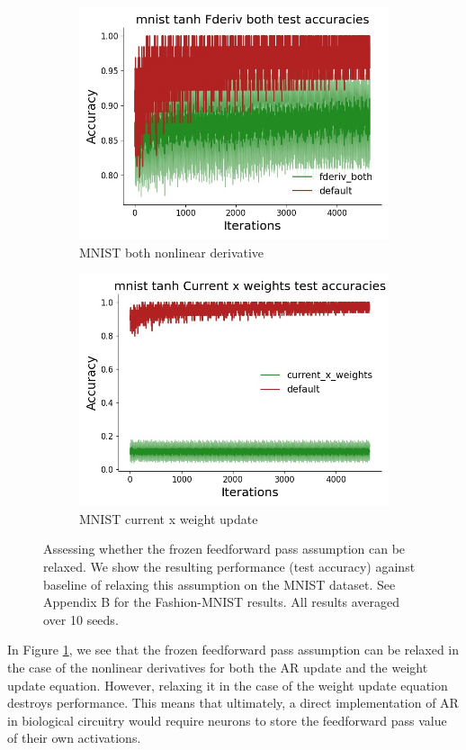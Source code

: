 \begin{figure}[htb]
\begin{subfigure}[b]{0.4\linewidth}
  \end{subfigure} 
  \begin{subfigure}[b]{0.4\linewidth}
    \centering
    \includegraphics[width=0.75\linewidth]{chapter_6_figures/AR/mnist_tanh_Fderiv_both_test_accuracies_prelim_2.jpg} 
    \caption{MNIST both nonlinear derivative} 
  \end{subfigure}%
  \begin{subfigure}[b]{0.4\linewidth}
    \centering
    \includegraphics[width=0.75\linewidth]{chapter_6_figures/AR/mnist_tanh_Current_x_weights_test_accuracies_prelim_2.jpg} 
    \caption{MNIST current x weight update} 
  \end{subfigure} 
  \caption{Assessing whether the frozen feedforward pass assumption can be relaxed. We show the resulting performance (test accuracy) against baseline of relaxing this assumption on the MNIST dataset. See Appendix B for the Fashion-MNIST results. All results averaged over 10 seeds.}
  \label{AR_no_frozen_pass}
\end{figure} 

In Figure \ref{AR_no_frozen_pass}, we see that the frozen feedforward pass assumption can be relaxed in the case of the nonlinear derivatives for both the AR update and the weight update equation. However, relaxing it in the case of the weight update equation destroys performance. This means that ultimately, a direct implementation of AR in biological circuitry would require neurons to store the feedforward pass value of their own activations. 

